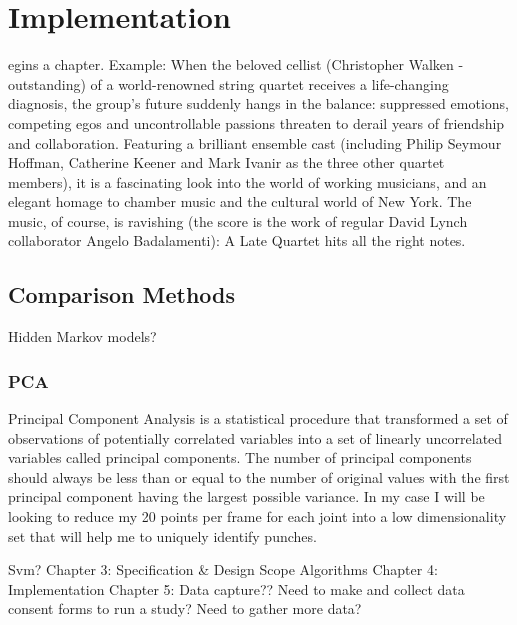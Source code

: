 %
%
\let\textcircled=\pgftextcircled
\chapter{Implementation}
\label{chap:intro}

egins a chapter. Example: When the beloved cellist (Christopher Walken - outstanding) of a world-renowned string quartet receives a life-changing diagnosis, the group's future suddenly hangs in the balance: suppressed emotions, competing egos and uncontrollable passions threaten to derail years of friendship and collaboration. Featuring a brilliant ensemble cast (including Philip Seymour Hoffman, Catherine Keener and Mark Ivanir as the three other quartet members), it is a fascinating look into the world of working musicians, and an elegant homage to chamber music and the cultural world of New York. The music, of course, is ravishing (the score is the work of regular David Lynch collaborator Angelo Badalamenti): A Late Quartet hits all the right notes.

\section{Comparison Methods}
\label{sec:sec01}

Hidden Markov models?

\subsection{PCA}
\label{subsec:subsec01}

Principal Component Analysis is a statistical procedure that transformed a set of observations of
potentially correlated variables into a set of linearly uncorrelated variables called principal components. The number of principal components should always be less than or equal to the number of original values with the first principal component having the largest possible variance.
In my case I will be looking to reduce my 20 points per frame for each joint into a low dimensionality set that will help me to uniquely identify punches.

Svm?\newline
Chapter 3: Specification \& Design\newline
Scope Algorithms\newline
Chapter 4: Implementation\newline
Chapter 5: Data capture??\newline
Need to make and collect data consent forms to run a study?\newline
Need to gather more data?\newline

